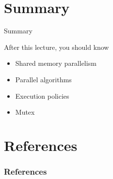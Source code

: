 \documentclass[12pt,t]{beamer}
\begin{document}
\begin{frame}{}

\end{frame}



\section{Summary}
\begin{frame}{Summary}
\begin{block}{After this lecture, you should know}
\begin{itemize}
\item Shared memory parallelism
\item Parallel algorithms
\item Execution policies
\item Mutex
\end{itemize}
\end{block}
\end{frame}

\section{References}

\begin{frame}[t, allowframebreaks]
\frametitle{References}


\end{frame}
\end{document}
